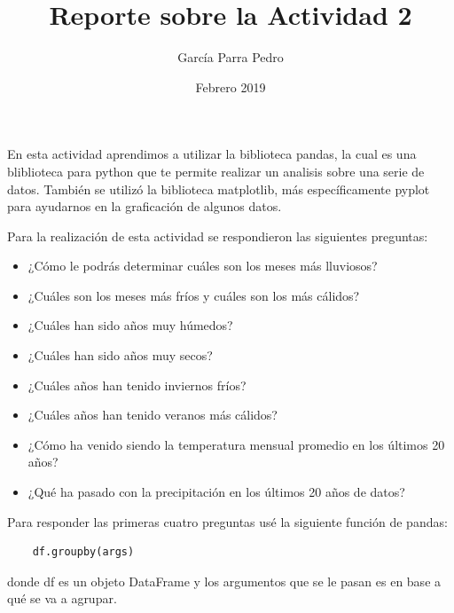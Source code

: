 \documentclass[12pt]{article}
\title{Reporte sobre la Actividad 2}
\author{García Parra Pedro}
\date{Febrero 2019}
\begin{document}
\maketitle

En esta actividad aprendimos a utilizar la biblioteca pandas, la cual es una bliblioteca para python que te permite realizar un analisis sobre una serie de datos. También se utilizó la biblioteca matplotlib, más específicamente pyplot para ayudarnos en la graficación de algunos datos.

Para la realización de esta actividad se respondieron las siguientes preguntas:
\begin{itemize}
    \item ¿Cómo le podrás determinar cuáles son los meses más lluviosos?
    \item ¿Cuáles son los meses más fríos y cuáles son los más cálidos?
    \item ¿Cuáles han sido años muy húmedos? 
    \item ¿Cuáles han sido años muy secos?
    \item ¿Cuáles años han tenido inviernos fríos?
    \item ¿Cuáles años han tenido veranos más cálidos?
    \item ¿Cómo ha venido siendo la temperatura mensual promedio en los últimos 20 años? 
    \item ¿Qué ha pasado con la precipitación en los últimos 20 años de datos? 
\end{itemize}

Para responder las primeras cuatro preguntas usé la siguiente función de pandas:
\begin{verbatim}
    df.groupby(args)
\end{verbatim}
donde df es un objeto DataFrame y los argumentos que se le pasan es en base a qué se va a agrupar.
\end{document}
